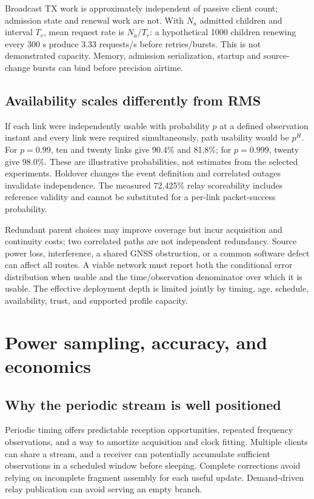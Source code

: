 \documentclass[11pt,letterpaper]{article}
\begin{document}
Broadcast TX work is approximately independent of passive client count; admission state and renewal work are not. With $N_a$ admitted children and interval $T_r$, mean request rate is $N_a/T_r$: a hypothetical 1000 children renewing every 300 s produce 3.33 requests/s before retries/bursts. This is not demonstrated capacity. Memory, admission serialization, startup and source-change bursts can bind before precision airtime.

\subsection{Availability scales differently from RMS}
If each link were independently usable with probability $p$ at a defined observation instant and every link were required simultaneously, path usability would be $p^H$. For $p=0.99$, ten and twenty links give 90.4\% and 81.8\%; for $p=0.999$, twenty give 98.0\%. These are illustrative probabilities, not estimates from the selected experiments. Holdover changes the event definition and correlated outages invalidate independence. The measured 72.425\% relay scoreability includes reference validity and cannot be substituted for a per-link packet-success probability.

Redundant parent choices may improve coverage but incur acquisition and continuity costs; two correlated paths are not independent redundancy. Source power loss, interference, a shared GNSS obstruction, or a common software defect can affect all routes. A viable network must report both the conditional error distribution when usable and the time/observation denominator over which it is usable. The effective deployment depth is limited jointly by timing, age, schedule, availability, trust, and supported profile capacity.

\section{Power sampling, accuracy, and economics}
\subsection{Why the periodic stream is well positioned}
Periodic timing offers predictable reception opportunities, repeated frequency observations, and a way to amortize acquisition and clock fitting. Multiple clients can share a stream, and a receiver can potentially accumulate sufficient observations in a scheduled window before sleeping. Complete corrections avoid relying on incomplete fragment assembly for each useful update. Demand-driven relay publication can avoid serving an empty branch.
\end{document}

